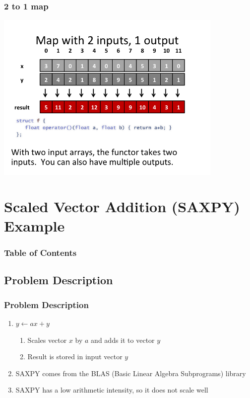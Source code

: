 \documentclass[xcolor=dvipsnames]{beamer}
\begin{document}
		\begin{frame} \frametitle{2 to 1 map}
		\includegraphics[width=110mm]{images/map2to1.png}
		\end{frame} 
		


\section{Scaled Vector Addition (SAXPY) Example} 

	\begin{frame} \frametitle{Table of Contents}
		\tableofcontents[currentsection]
	\end{frame} 
	
	\subsection{Problem Description}
	
		\begin{frame} \frametitle{Problem Description}
		\begin{enumerate}
		
		\item $y \leftarrow ax + y$
		
		\begin{enumerate}
			\item Scales vector $x$ by $a$ and adds it to vector $y$ 
			\item Result is stored in input vector $y$
		\end{enumerate}
		
		\item SAXPY comes from the BLAS (Basic Linear Algebra Subprograms) library
		\item SAXPY has a low arithmetic intensity, so it does not scale well
		
		\end{enumerate}
		\end{frame}
	
\end{document}
